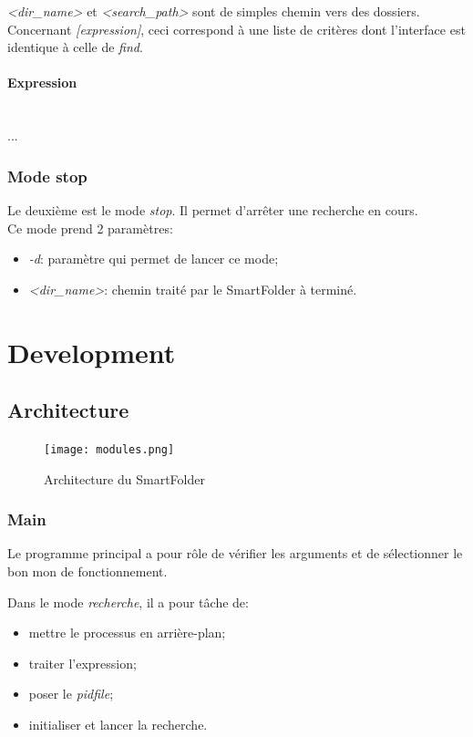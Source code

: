 \documentclass[11pt, a4paper]{article}
\newcommand{\paragraphnl}[1]{\paragraph{#1}\mbox{}\\}
\begin{document}
\textit{<dir\_name>} et \textit{<search\_path>} sont de simples chemin vers des dossiers.
Concernant \textit{[expression]}, ceci correspond à une liste de critères dont l'interface est identique à celle de \textit{find}.

\paragraphnl{Expression}
...

\subsubsection{Mode stop}
Le deuxième est le mode \textit{stop}.
Il permet d'arrêter une recherche en cours. \\

Ce mode prend 2 paramètres:
\begin{itemize}
    \item \textit{-d}: paramètre qui permet de lancer ce mode;
    \item \textit{<dir\_name>}: chemin traité par le SmartFolder à terminé.
\end{itemize}

\newpage

\section{Development}
\subsection{Architecture}

\begin{figure}[H]
    \begin{center}
        \texttt{[image: modules.png]}
    \end{center}
    \caption{Architecture du SmartFolder}
    \label{Architecture du SmartFolder}
\end{figure}

\subsubsection{Main}

Le programme principal a pour rôle de vérifier les arguments et de sélectionner le bon mon de fonctionnement.

Dans le mode \textit{recherche}, il a pour tâche de:
\begin{itemize}
    \item mettre le processus en arrière-plan;
    \item traiter l'expression;
    \item poser le \textit{pidfile};
    \item initialiser et lancer la recherche.
\end{itemize}
\end{document}

